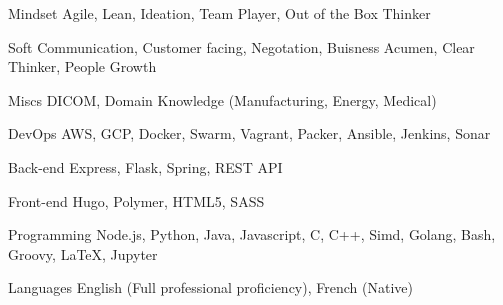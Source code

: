 

\begin{cvskills}
  \cvskill
  {Mindset} %
  {Agile, Lean, Ideation, Team Player, Out of the Box Thinker} %

  \cvskill
  {Soft} %
  {Communication, Customer facing, Negotation, Buisness Acumen, Clear Thinker, People Growth} %

  \cvskill
  {Miscs} %
  {DICOM, Domain Knowledge (Manufacturing, Energy, Medical)} %

  \cvskill
    {DevOps} %
    {AWS, GCP, Docker, Swarm, Vagrant, Packer, Ansible, Jenkins, Sonar} %

  \cvskill
    {Back-end} %
    {Express, Flask, Spring, REST API} %

  \cvskill
    {Front-end} %
    {Hugo, Polymer, HTML5, SASS} %

  \cvskill
    {Programming} %
    {Node.js, Python, Java, Javascript, C, C++, Simd, Golang, Bash, Groovy, LaTeX, Jupyter} %

  \cvskill
    {Languages} %
    {English (Full professional proficiency), French (Native)} %

\end{cvskills}
